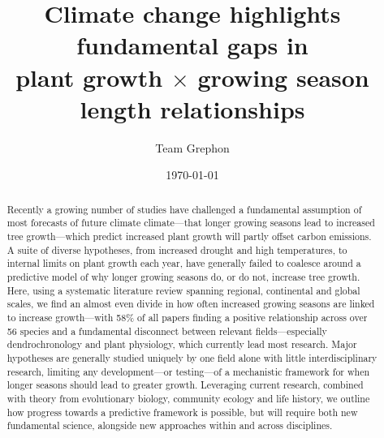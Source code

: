 \documentclass[11pt]{article}
\begin{document}
\renewcommand{\refname}{\CHead{}}


\title{Climate change highlights fundamental gaps in\\ plant growth $\times$ growing season length relationships} %
\author{Team Grephon}
\date{\today}
\maketitle



\begin{abstract} %
Recently a growing number of studies have challenged a fundamental assumption of most forecasts of future climate climate---that longer growing seasons lead to increased tree growth---which predict increased plant growth will partly offset carbon emissions. A suite of diverse hypotheses, from increased drought and high temperatures, to internal limits on plant growth each year, have generally failed to coalesce around a predictive model of why longer growing seasons do, or do not, increase tree growth. Here, using a systematic literature review spanning regional, continental and global scales, we find an almost even divide in how often increased growing seasons are linked to increase growth---with 58\% of all papers finding a positive relationship across over 56 species and a fundamental disconnect between relevant fields---especially dendrochronology and plant physiology, which currently lead most research. Major hypotheses are generally studied uniquely by one field alone with little interdisciplinary research, limiting any development---or testing---of a mechanistic framework for when longer seasons should lead to greater growth. Leveraging current research, combined with theory from evolutionary biology, community ecology and life history, we outline how progress towards a predictive framework is possible, but will require both new fundamental science, alongside new approaches within and across disciplines.  
\end{abstract}
\end{document}

